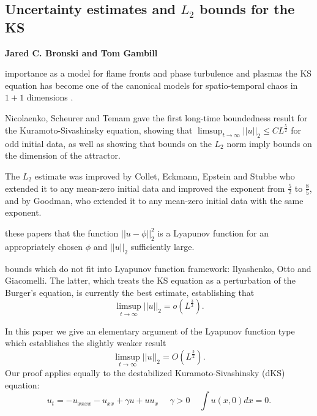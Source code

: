\subsection{Uncertainty estimates and $L_2$ bounds for the KS}

{\bf
Jared C. Bronski
and
Tom Gambill}

importance as a model for flame fronts\cite{siv} and
phase turbulence\cite{KS}
and plasmas\cite{LMRT} the
KS equation has become
one of the canonical models for
spatio-temporal chaos in $1\!+\!1$ dimensions
\cite{JOHNSON,KEVREKIDIS,Man}.

Nicolaenko, Scheurer and Temam\cite{NICO} gave the first long-time
boundedness result for the Kuramoto-Sivashinsky equation, showing
 that $\limsup_{t \rightarrow \infty} |\!|u|\!|_2
\le C L^{\frac{5}{2}}$
for odd initial data, as well as showing
that bounds on the $L_2$ norm imply bounds on the dimension of the attractor.

The $L_2$ estimate was improved by
Collet, Eckmann, Epstein and
Stubbe\cite{CEES} who  extended it to any mean-zero initial data and improved the exponent from
$\frac{5}{2}$ to $\frac{8}{5}$,
and by Goodman\cite{Good}, who extended it to
any mean-zero initial data with the same exponent.

these papers that the function $|\!|u-\phi|\!|_2^2$ is a Lyapunov function for
an appropriately chosen $\phi$ and $|\!|u|\!|_2$ sufficiently large.

bounds which do not fit into Lyapunov function framework:
Ilyashenko\cite{Ilyashenko},
Otto  and Giacomelli\cite{GO}.
The latter, which treats the KS equation as a
perturbation of the Burger's equation, is currently the best estimate, establishing that
\[
\limsup_{t \rightarrow \infty} |\!|u|\!|_2 = o(L^{\frac{3}{2}}).
\]

In this paper we give an elementary argument of the Lyapunov function
type which establishes the slightly weaker result
\[
\limsup_{t \rightarrow \infty} |\!|u|\!|_2 = O(L^{\frac{3}{2}}).
\]
Our proof applies equally to the destabilized Kuramoto-Sivashinsky (dKS)
equation:
\[
u_t = -u_{xxxx} - u_{xx} + \gamma  u + u u_x ~~~~~~\gamma > 0 ~~~~~ \int u(x,0)dx = 0.
\]

